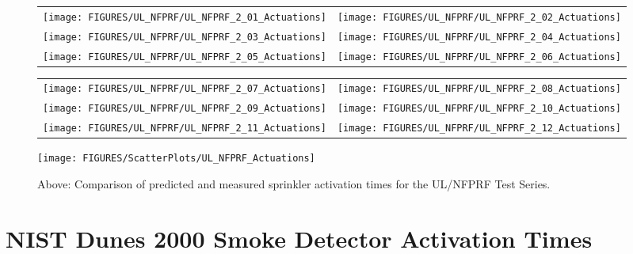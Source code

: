 \begin{figure}[p]
\begin{tabular*}{\textwidth}{l@{\extracolsep{\fill}}r}
\texttt{[image: FIGURES/UL\_NFPRF/UL\_NFPRF\_2\_01\_Actuations]} &
\texttt{[image: FIGURES/UL\_NFPRF/UL\_NFPRF\_2\_02\_Actuations]} \\
\texttt{[image: FIGURES/UL\_NFPRF/UL\_NFPRF\_2\_03\_Actuations]} &
\texttt{[image: FIGURES/UL\_NFPRF/UL\_NFPRF\_2\_04\_Actuations]} \\
\texttt{[image: FIGURES/UL\_NFPRF/UL\_NFPRF\_2\_05\_Actuations]} &
\texttt{[image: FIGURES/UL\_NFPRF/UL\_NFPRF\_2\_06\_Actuations]}
\end{tabular*}
\label{UL_NFPRF_2_1}
\end{figure}

\begin{figure}[p]
\begin{tabular*}{\textwidth}{l@{\extracolsep{\fill}}r}
\texttt{[image: FIGURES/UL\_NFPRF/UL\_NFPRF\_2\_07\_Actuations]} &
\texttt{[image: FIGURES/UL\_NFPRF/UL\_NFPRF\_2\_08\_Actuations]} \\
\texttt{[image: FIGURES/UL\_NFPRF/UL\_NFPRF\_2\_09\_Actuations]} &
\texttt{[image: FIGURES/UL\_NFPRF/UL\_NFPRF\_2\_10\_Actuations]} \\
\texttt{[image: FIGURES/UL\_NFPRF/UL\_NFPRF\_2\_11\_Actuations]} &
\texttt{[image: FIGURES/UL\_NFPRF/UL\_NFPRF\_2\_12\_Actuations]}
\end{tabular*}
\label{UL_NFPRF_2_2}
\end{figure}

\begin{figure}[p]
\begin{center}
\texttt{[image: FIGURES/ScatterPlots/UL\_NFPRF\_Actuations]}
\end{center}
\caption[Summary of sprinkler actuation predictions, UL/NFPRF Tests]
{Above: Comparison of predicted and measured sprinkler activation times for the UL/NFPRF Test Series.}
\label{UL_NFPRF}
\end{figure}







\clearpage

\section{NIST Dunes 2000 Smoke Detector Activation Times}

